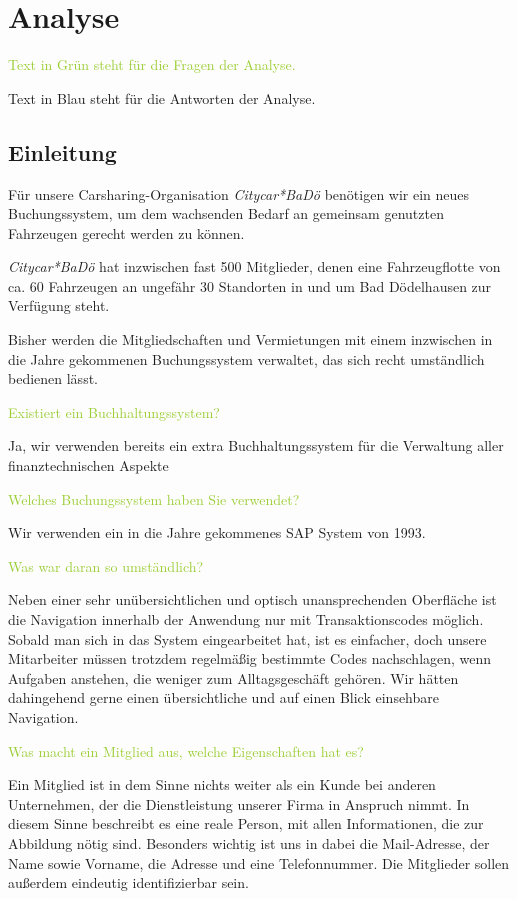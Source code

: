 \chapter{Analyse}

\textcolor{YellowGreen}{Text in Grün steht für die Fragen der Analyse.}

\textcolor{NavyBlue}{Text in Blau steht für die Antworten der Analyse.}

\section{Einleitung}

Für unsere Carsharing-Organisation \emph{Citycar*BaDö} benötigen wir ein neues Buchungssystem, um dem wachsenden Bedarf an gemeinsam genutzten Fahrzeugen gerecht werden zu können. 

\emph{Citycar*BaDö} hat inzwischen fast 500 Mitglieder, denen eine Fahrzeugflotte von ca. 60 Fahrzeugen an ungefähr 30 Standorten in und um Bad Dödelhausen zur Verfügung steht. 

Bisher werden die Mitgliedschaften und Vermietungen mit einem inzwischen in die Jahre gekommenen Buchungssystem verwaltet, das sich recht umständlich bedienen lässt. 

\textcolor{YellowGreen}{Existiert ein Buchhaltungssystem?}

\textcolor{NavyBlue}{Ja, wir verwenden bereits ein extra Buchhaltungssystem für die Verwaltung aller finanztechnischen Aspekte}

\textcolor{YellowGreen}{Welches Buchungssystem haben Sie verwendet?}

\textcolor{NavyBlue}{Wir verwenden ein in die Jahre gekommenes SAP System von 1993.}

\textcolor{YellowGreen}{Was war daran so umständlich?}

\textcolor{NavyBlue}{Neben einer sehr unübersichtlichen und optisch unansprechenden Oberfläche ist die Navigation innerhalb der Anwendung nur mit Transaktionscodes möglich. Sobald man sich in das System eingearbeitet hat, ist es einfacher, doch unsere Mitarbeiter müssen trotzdem regelmäßig bestimmte Codes nachschlagen, wenn Aufgaben anstehen, die weniger zum Alltagsgeschäft gehören. Wir hätten dahingehend gerne einen übersichtliche und auf einen Blick einsehbare Navigation.}

\textcolor{YellowGreen}{Was macht ein Mitglied aus, welche Eigenschaften hat es?}

\textcolor{NavyBlue}{Ein Mitglied ist in dem Sinne nichts weiter als ein Kunde bei anderen Unternehmen, der die Dienstleistung unserer Firma in Anspruch nimmt. 
In diesem Sinne beschreibt es eine reale Person, mit allen Informationen, die zur Abbildung nötig sind. 
Besonders wichtig ist uns in dabei die Mail-Adresse, der Name sowie Vorname, die Adresse und eine Telefonnummer. Die Mitglieder sollen außerdem eindeutig identifizierbar sein.} %

